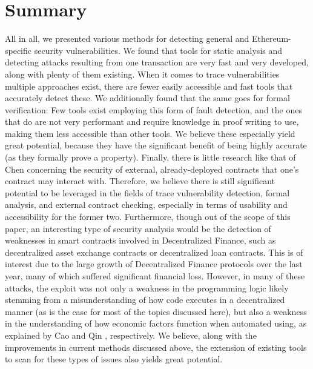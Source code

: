 \documentclass[letterpaper,twocolumn,10pt]{article}
\begin{document}
\section{Summary}
All in all, we presented various methods for detecting general and Ethereum-specific security vulnerabilities.  We found that tools for static analysis and detecting attacks resulting from one transaction are very fast and very developed, along with plenty of them existing. When it comes to trace vulnerabilities multiple approaches exist, there are fewer easily accessible and fast tools that accurately detect these. We additionally found that the same goes for formal verification: Few tools exist employing this form of fault detection, and the ones that do are not very performant and require knowledge in proof writing to use, making them less accessible than other tools. We believe these especially yield great potential, because they have the significant benefit of being highly accurate (as they formally prove a property). Finally, there is little research like that of Chen \cite{chen_zhu_li_chen_li_luo_lin_zhange_2018} concerning the security of external, already-deployed contracts that one's contract may interact with. Therefore, we believe there is still significant potential to be leveraged in the fields of trace vulnerability detection, formal analysis, and external contract checking, especially in terms of usability and accessibility for the former two. Furthermore, though out of the scope of this paper, an interesting type of security analysis would be the detection of weaknesses in smart contracts involved in Decentralized Finance, such as decentralized asset exchange contracts or decentralized loan contracts. This is of interest due to the large growth of Decentralized Finance protocols over the last year, many of which suffered significant financial loss. However, in many of these attacks, the exploit was not only a weakness in the programming logic likely stemming from a misunderstanding of how code executes in a decentralized manner (as is the case for most of the topics discussed here), but also a weakness in the understanding of how economic factors function when automated using, as explained by Cao \cite{flash1} and Qin \cite{flash2}, respectively. We believe, along with the improvements in current methods discussed above, the extension of existing tools to scan for these types of issues also yields great potential.

 

\end{document}
